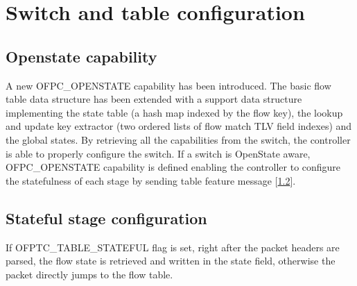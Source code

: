 \chapter{Switch and table configuration}
\label{chap:configuration}

\section{Openstate capability}
\label{sec:capability}
A new OFPC\_OPENSTATE capability has been introduced.
The basic flow table data structure has been extended with a support data structure implementing the state table (a hash map indexed by the flow key), the lookup and update key extractor (two ordered lists of flow match TLV field indexes) and the global states.
By retrieving all the capabilities from the switch, the controller is able to properly configure the switch. If a switch is OpenState aware, OFPC\_OPENSTATE capability is defined enabling the controller to configure the statefulness of each stage by sending table feature message [\ref{sec:table_conf}].

\section{Stateful stage configuration}
\label{sec:table_conf}
If OFPTC\_TABLE\_STATEFUL flag is set, right after the packet headers are parsed, the flow state is retrieved and written in the state field, otherwise the packet directly jumps to the flow table. 

